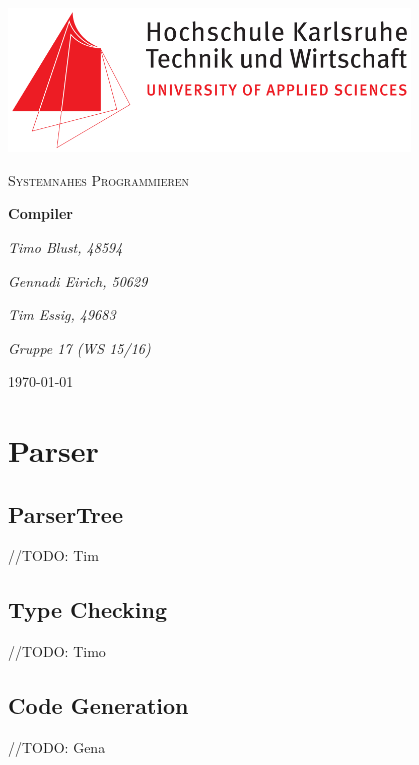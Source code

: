 \documentclass[
a4paper
]{scrreprt}
\begin{document}
	\sffamily %
	
	
	\begin{titlepage}
		\centering
		\includegraphics[width=0.8\textwidth]{./images/logo_hska.png}\par\vspace{1cm}
		\vspace{1cm}
		
		{\scshape\Large Systemnahes Programmieren\par}
		\vspace{1.5cm}
		
		{\huge\textbf{Compiler}\par}
		\vspace{2cm}
		
		{\Large\itshape Timo Blust, 48594\par}
		{\Large\itshape Gennadi Eirich, 50629\par}
		{\Large\itshape Tim Essig, 49683\par\par}
		\vspace{2cm}
		
		{\Large\itshape Gruppe 17 (WS 15/16)\par}
		
		\vfill
		
		{\large \today\par}
	\end{titlepage}
	
	
	\tableofcontents
	
	\chapter{Parser}
	\section{ParserTree}
		//TODO: Tim
	
	\section{Type Checking}
		//TODO: Timo
		
    \section{Code Generation}
	    //TODO: Gena

	
\end{document}
